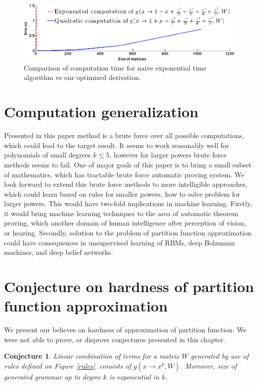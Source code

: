 \documentclass{article}
\newtheorem{conjecture}[theorem]{Conjecture}
\begin{document}
\begin{figure}[h]
\centering
\includegraphics[scale=0.24]{img/time_approx.png}
\caption{Comparison of computation time for naive exponential time algorithm vs our optimized derivation.}
\label{time_approx}
\end{figure}

\section{Computation generalization}\label{agenda}

Presented in this paper method is a brute force over all possible computations, 
which could lead to the target result. It seems to work reasonably well
for polynomials of small degrees $k \leq 5$, however for larger powers 
brute force methods seems to fail. One of major goals of this paper is to
bring a small subset of mathematics, which has tractable brute force automatic proving
system. We look forward to extend this brute force methods to more intelligible approaches, which
could learn based on rules for smaller powers, how to solve problem for larger powers. This would
have two-fold implications in machine learning. Firstly, it would bring machine learning techniques
to the area of automatic theorem proving, which another domain of human intelligence after perception
of vision, or hearing. Secondly, solution to the problem of partition function approximation
could have consequences in unsupervised learning of RBMs, deep Bolzmann machines, and deep
belief networks. 

\section{Conjecture on hardness of partition function approximation}

We present our believes on hardness of approximation of partition function. 
We were not able to prove, or disprove conjectures presented in this chapter.
\begin{conjecture}
Linear combination of terms for a matrix $W$ generated by use of rules defined on Figure \ref{rules}.
consists of $g(x \rightarrow x^k, W)$. Moreover, size of generated grammar
up to degree $k$ is exponential in $k$.
\label{simple}
\end{conjecture}
\end{document}
